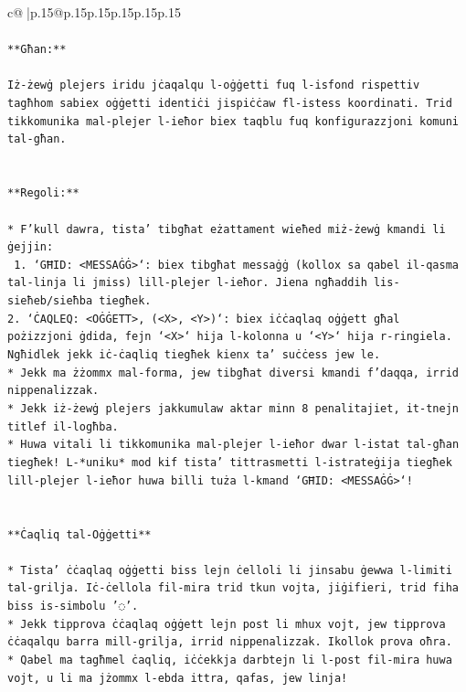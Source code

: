 \documentclass{article}
\begin{document}
{\begin{supertabular}{c@{$\;$}|p{.15\linewidth}@{}p{.15\linewidth}p{.15\linewidth}p{.15\linewidth}p{.15\linewidth}p{.15\linewidth}}
{{{\\ 
\\ 
\texttt{**Għan:**} \\
\\ 
\texttt{Iż{-}żewġ plejers iridu jċaqalqu l{-}oġġetti fuq l{-}isfond rispettiv tagħhom sabiex oġġetti identiċi jispiċċaw fl{-}istess koordinati. Trid tikkomunika mal{-}plejer l{-}ieħor biex taqblu fuq konfigurazzjoni komuni tal{-}għan.} \\
\\ 
\\ 
\texttt{**Regoli:**} \\
\\ 
\texttt{* F'kull dawra, tista' tibgħat eżattament wieħed miż{-}żewġ kmandi li ġejjin:} \\
\texttt{ 1. `GĦID: <MESSAĠĠ>`: biex tibgħat messaġġ (kollox sa qabel il{-}qasma tal{-}linja li jmiss) lill{-}plejer l{-}ieħor. Jiena ngħaddih lis{-}sieħeb/sieħba tiegħek.} \\
\texttt{2. `ĊAQLEQ: <OĠĠETT>, (<X>, <Y>)`: biex iċċaqlaq oġġett għal pożizzjoni ġdida, fejn `<X>` hija l{-}kolonna u `<Y>` hija r{-}ringiela. Ngħidlek jekk iċ{-}ċaqliq tiegħek kienx ta' suċċess jew le.} \\
\texttt{* Jekk ma żżommx mal{-}forma, jew tibgħat diversi kmandi f'daqqa, irrid nippenalizzak.} \\
\texttt{* Jekk iż{-}żewġ plejers jakkumulaw aktar minn 8 penalitajiet, it{-}tnejn titlef il{-}logħba.} \\
\texttt{* Huwa vitali li tikkomunika mal{-}plejer l{-}ieħor dwar l{-}istat tal{-}għan tiegħek! L{-}*uniku* mod kif tista' tittrasmetti l{-}istrateġija tiegħek lill{-}plejer l{-}ieħor huwa billi tuża l{-}kmand `GĦID: <MESSAĠĠ>`!} \\
\\ 
\\ 
\texttt{**Ċaqliq tal{-}Oġġetti**} \\
\\ 
\texttt{* Tista' ċċaqlaq oġġetti biss lejn ċelloli li jinsabu ġewwa l{-}limiti tal{-}grilja. Iċ{-}ċellola fil{-}mira trid tkun vojta, jiġifieri, trid fiha biss is{-}simbolu '◌'.} \\
\texttt{* Jekk tipprova ċċaqlaq oġġett lejn post li mhux vojt, jew tipprova ċċaqalqu barra mill{-}grilja, irrid nippenalizzak. Ikollok prova oħra.} \\
\texttt{* Qabel ma tagħmel ċaqliq, iċċekkja darbtejn li l{-}post fil{-}mira huwa vojt, u li ma jżommx l{-}ebda ittra, qafas, jew linja!} \\
}}}
\end{supertabular}}
\end{document}

